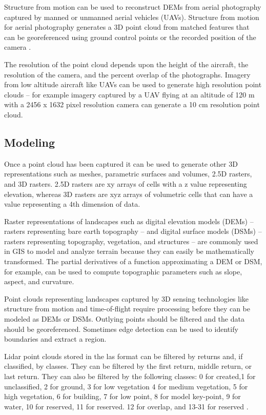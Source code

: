\documentclass{article}
\begin{document}
Structure from motion can be used to reconstruct DEMs from aerial photography 
captured by manned or unmanned aerial vehicles (UAVs). 
%
Structure from motion for aerial photography generates a 3D point cloud from matched features 
that can be georeferenced using ground control points or the recorded position of the camera \citep{Fonstad2013}.

The resolution of the point cloud depends upon 
the height of the aircraft, the resolution of the camera, and the percent overlap of the photographs. 
Imagery from low altitude aircraft like UAVs can be used to generate high resolution point clouds -- 
for example
imagery captured by a UAV flying at an altitude of 120 m 
with a 2456 x 1632 pixel resolution camera 
can generate a 10 cm resolution point cloud. 

\subsection{Modeling}
Once a point cloud has been captured 
it can be used to generate other 3D representations 
such as meshes, parametric surfaces and volumes, 
2.5D rasters, and 3D rasters.
2.5D rasters are xy arrays of cells with a z value representing elevation,
whereas 3D rasters are xyz arrays of volumetric cells 
that can have a value representing a 4th dimension of data. 
%

Raster representations of landscapes such as 
digital elevation models (DEMs)
-- rasters representing bare earth topography --
and digital surface models (DSMs)
-- rasters representing topography, vegetation, and structures -- 
are commonly used in GIS to model and analyze terrain because
they can easily be mathematically transformed. 
%
The partial derivatives of a function approximating a DEM or DSM, for example, 
can be used to compute topographic parameters such as slope, aspect, and curvature. 

Point clouds representing landscapes captured by 3D sensing technologies like
structure from motion and time-of-flight require processing
before they can be modeled as DEMs or DSMs. 
%
Outlying points should be filtered and the data should be georeferenced. 
%
Sometimes edge detection can be used to identify boundaries and extract a region. 

Lidar point clouds stored in the las format can be filtered by returns and, if classified, by classes. 
%
They can be filtered by the first return, middle return, or last return.
They can also be filtered by the following classes:
0 for created,1 for unclassified, 2 for ground, 3 for low vegetation
4 for medium vegetation, 
5 for high vegetation,
6 for building,
7 for low point, 
8 for model key-point, 
9 for water,
10 for reserved, 
11 for reserved.
12 for overlap, 
and 13-31 for reserved 
\citep{ASPRS2013}.
\end{document}
